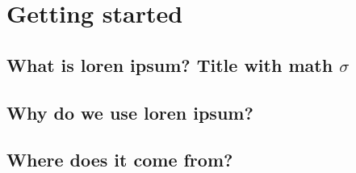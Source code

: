 
\chapter{Getting started}  %

\ifpdf
    \graphicspath{{Chapter1/Figs/Raster/}{Chapter1/Figs/PDF/}{Chapter1/Figs/}}
\else
    \graphicspath{{Chapter1/Figs/Vector/}{Chapter1/Figs/}}
\fi


\section{What is loren ipsum? Title with math \texorpdfstring{$\sigma$}{[sigma]}} %



\section{Why do we use loren ipsum?} %


\section{Where does it come from?}  %
\label{section1.3}

